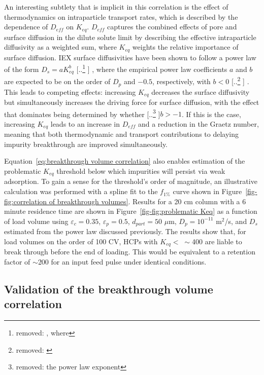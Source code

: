 \documentclass[preprint,review,12pt]{elsarticle}
\providecommand{\DIFaddtex}[1]{{\protect\color{blue} \sf #1}} %
\providecommand{\DIFdeltex}[1]{{\protect\color{red} [..\footnote{removed: #1} ]}} %
\providecommand{\DIFaddbegin}{} %
\providecommand{\DIFaddend}{} %
\providecommand{\DIFdelbegin}{} %
\providecommand{\DIFdelend}{} %
\providecommand{\DIFadd}[1]{\texorpdfstring{\DIFaddtex{#1}}{#1}} %
\providecommand{\DIFdel}[1]{\texorpdfstring{\DIFdeltex{#1}}{}} %
\begin{document}
        An interesting subtlety that is implicit in this correlation is the effect of thermodynamics on intraparticle transport rates, which is described by the dependence of $D_{eff}$ on $K_{eq}$. $D_{eff}$ captures the combined effects of pore and surface diffusion in the dilute solute limit by describing the effective intraparticle diffusivity as a weighted sum, where $K_{eq}$ weights the relative importance of surface diffusion. IEX surface diffusivities have been shown to follow a power law of the form $D_s = a K_{eq}^b$ \DIFdelbegin \DIFdel{, where }\DIFdelend \DIFaddbegin \DIFadd{\cite{Khanal7004}, where the empirical power law coefficients $a$ and $b$ are expected to be on the order of $D_p$ and $-0.5$, respectively, with }\DIFaddend $b < 0$ \DIFdelbegin \DIFdel{\cite{Khanal7004}}\DIFdelend \DIFaddbegin \DIFadd{\cite{Wesselingh2001, Lenhoff2008}}\DIFaddend . This leads to competing effects: increasing $K_{eq}$ decreases the surface diffusivity but simultaneously increases the driving force for surface diffusion, with the effect that dominates being determined by whether \DIFdelbegin \DIFdel{the power law exponent }\DIFdelend $b > -1$. If this is the case, increasing $K_{eq}$ leads to an increase in $D_{eff}$ and a reduction in the Graetz number, meaning that both thermodynamic and transport contributions to delaying impurity breakthrough are improved simultaneously.

        Equation~\ref{eq:breakthrough volume correlation} also enables estimation of the problematic $K_{eq}$ threshold below which impurities will persist via weak adsorption. To gain a sense for the threshold's order of magnitude, an illustrative calculation was performed with a spline fit to the $f_{1\%}$ curve shown in Figure~\ref{fig-fig:correlation of breakthrough volumes}. Results for a 20 cm column with a 6 minute residence time are shown in Figure~\ref{fig-fig:problematic Keq} as a function of load volume using $\varepsilon_c = 0.35$, $\varepsilon_p = 0.5$, $d_{part} = 50$ $\mu$m, $D_p = 10^{-11}$ m$^2$/s, and $D_s$ estimated from the power law discussed previously. The results show that, for load volumes on the order of 100 CV, HCPs with $K_{eq} < \; \sim$400 are liable to break through before the end of loading. This would be equivalent to a retention factor of $\sim$200 for an input feed pulse under identical conditions.


    \subsection{Validation of the breakthrough volume correlation} \label{ssec:validation}
        \DIFdelbegin %
\end{document}
